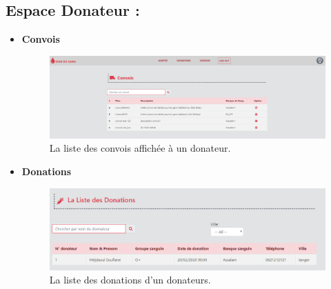 \documentclass[12pt,a4paper,twoside]{report}
\begin{document}
{		\subsection{Espace Donateur :}{
		\begin{itemize}
					\item \textbf{Convois}
					\begin{figure}[H]
									 \includegraphics[width=13cm]{Images/convoiD.png}
									 \centering
									 \caption{\label{convoiD} La liste des convois affichée à un donateur.}
								\end{figure}
					
					\item \textbf{Donations}
					\begin{figure}[H]
									 \includegraphics[width=13cm]{Images/donD.png}
									 \centering
									 \caption{\label{donD} La liste des donations d'un donateurs.}
									\end{figure}
			\end{itemize}
		}
	}
\end{document}
